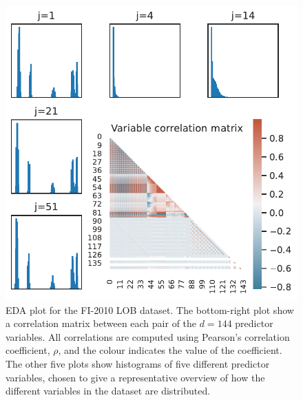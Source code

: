 \documentclass{statsmsc}
\begin{document}
{%
\begin{figure}
    \begin{center}
        \includegraphics[scale=1]{figures/lob_data_eda_plot.pdf}
    \end{center}
    \caption{
        \ac{EDA} plot for the FI-2010 \ac{LOB} dataset.
        The bottom-right plot show a correlation matrix between each pair
        of the $d=144$ predictor variables. All correlations are computed using
        Pearson's correlation coefficient, $\rho$, and the colour indicates the
        value of the coefficient.  The other five plots show histograms of five
        different predictor variables, chosen to give a representative overview of
        how the different variables in the dataset are distributed.
    }
    \label{fig:lob_eda}
\end{figure}


}
\end{document}
